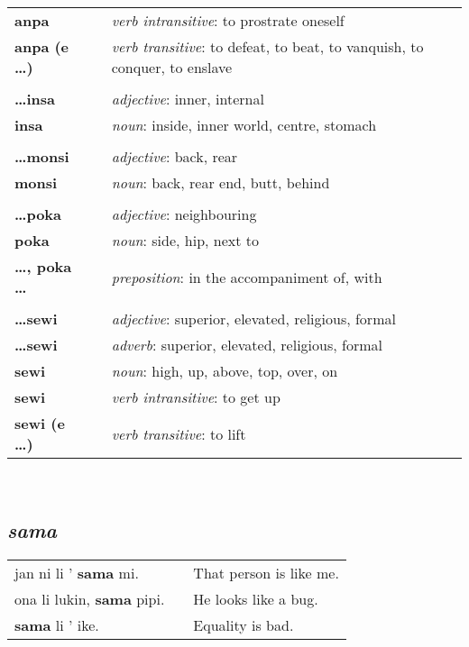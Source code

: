 \begin{supertabular}{p{2,5cm}|ll}
\textbf{anpa} && \textit{verb intransitive}: to prostrate oneself \\ %
\textbf{anpa (e \dots)} && \textit{verb transitive}: to defeat, to beat, to vanquish, to conquer, to enslave \\ %
 && \\ %
\textbf{\dots insa} && \textit{adjective}: inner, internal \\ %
\textbf{insa} && \textit{noun}: inside, inner world, centre, stomach \\ %
 && \\ %
\textbf{\dots monsi} && \textit{adjective}: back, rear \\ %
\textbf{monsi} && \textit{noun}: back, rear end, butt, behind \\ %
 && \\ %
\textbf{\dots poka} && \textit{adjective}: neighbouring \\ %
\textbf{poka} && \textit{noun}: side, hip, next to \\ %
\textbf{\dots , poka \dots} && \textit{preposition}: in the accompaniment of, with \\ %
 && \\ %
\textbf{\dots sewi} && \textit{adjective}: superior, elevated, religious, formal \\ %
\textbf{\dots sewi} && \textit{adverb}: superior, elevated, religious, formal \\ %
\textbf{sewi} && \textit{noun}: high, up, above, top, over, on \\ %
\textbf{sewi} && \textit{verb intransitive}: to get up \\ %
\textbf{sewi (e \dots)} && \textit{verb transitive}: to lift \\ %
\end{supertabular} \\
%
\subsection*{\textit{sama}}
%
\begin{supertabular}{p{5,5cm}|ll}
jan ni li ' \textbf{sama} mi. && That person is like me. \\
ona li lukin, \textbf{sama} pipi. && He looks like a bug. \\
\textbf{sama} li ' ike. && Equality is bad. \\
\end{supertabular} 
%
